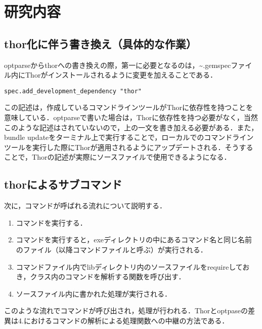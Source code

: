 \chapter{研究内容}\label{ux7814ux7a76ux5185ux5bb9}

    \section{thor化に伴う書き換え（具体的な作業）}\label{thorux5316ux306bux4f34ux3046ux66f8ux304dux63dbux3048ux5177ux4f53ux7684ux306aux4f5cux696d}

optparseからthorへの書き換えの際，第一に必要となるのは，\textasciitilde{}.gemspecファイル内にThorがインストールされるように変更を加えることである．

\begin{verbatim}
spec.add_development_dependency "thor"
\end{verbatim}

この記述は，作成しているコマンドラインツールがThorに依存性を持つことを意味している．optparseで書いた場合は，Thorに依存性を持つ必要がなく，当然このような記述はされていないので，上の一文を書き加える必要がある．また，bundle
updateをターミナル上で実行することで，ローカルでのコマンドラインツールを実行した際にThorが適用されるようにアップデートされる．そうすることで，Thorの記述が実際にソースファイルで使用できるようになる．

\section{thorによるサブコマンド}\label{thorux306bux3088ux308bux30b5ux30d6ux30b3ux30deux30f3ux30c9}

次に，コマンドが呼ばれる流れについて説明する．

\begin{enumerate}
\def\labelenumi{\arabic{enumi}.}
\tightlist
\item
  コマンドを実行する．
\item
  コマンドを実行すると，exeディレクトリの中にあるコマンド名と同じ名前のファイル（以降コマンドファイルと呼ぶ）が実行される．
\item
  コマンドファイル内でlibディレクトリ内のソースファイルをrequireしておき，クラス内のコマンドを解析する関数を呼び出す．
\item
  ソースファイル内に書かれた処理が実行される．
\end{enumerate}

このような流れでコマンドが呼び出され，処理が行われる．Thorとoptpaseの差異は4.におけるコマンドの解析による処理関数への中継の方法である．

